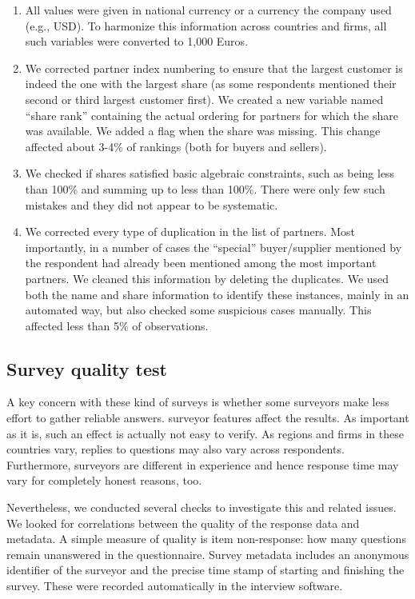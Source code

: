 \documentclass[final, dvipsnames, authoryear,12pt]{elsarticle}
\begin{document}
\begin{enumerate}
    \item All values were given in national currency or a currency the company used (e.g., USD). To harmonize this information across countries and firms, all such variables were converted to 1,000 Euros. 
    
    \item We corrected partner index numbering to ensure that the largest customer is indeed the one with the largest share (as some respondents mentioned their second or third largest customer first). We created a new variable named ``share rank'' containing the actual ordering for partners for which the share was available. We added a flag when the share was missing. This change affected about 3-4\% of rankings (both for buyers and sellers). 
    
    \item We checked if shares satisfied basic algebraic constraints, such as being less than 100\% and summing up to less than 100\%. There were only few such mistakes and  they did not appear to be systematic.
    
    \item We corrected every type of duplication in the list of partners. Most importantly, in a number of cases the ``special'' buyer/supplier mentioned by the respondent had already been mentioned among the most important partners. We cleaned this information by deleting the duplicates. We used both the name and share information to identify these instances, mainly in an automated way, but also checked some suspicious cases manually. This affected less than 5\% of observations.

\end{enumerate}

\subsection{Survey quality test}
\label{sec:quality_test}

A key concern with these kind of surveys is whether some surveyors make less effort to gather reliable answers. 
surveyor features affect the results. As important as it is, such an effect is actually not easy to verify. As regions and firms in these countries vary, replies to questions may also vary across respondents. Furthermore, surveyors are different in experience and hence response time may vary for completely honest reasons, too. 

Nevertheless, we conducted several checks to investigate this and related issues. We looked for correlations between the quality of the response data and metadata. A simple measure of quality is item non-response: how many questions remain unanswered in the questionnaire. Survey metadata includes an anonymous identifier of the surveyor and the precise time stamp of starting and finishing the survey. These were recorded automatically in the interview software.
\end{document}
